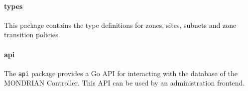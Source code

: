 \paragraph{types} This package contains the type definitions for zones, sites, subnets and zone transition policies.
\paragraph{api} The \texttt{api} package provides a Go \acs{API} for interacting with the database of the MONDRIAN Controller. This \acs{API} can be used by an administration frontend.


